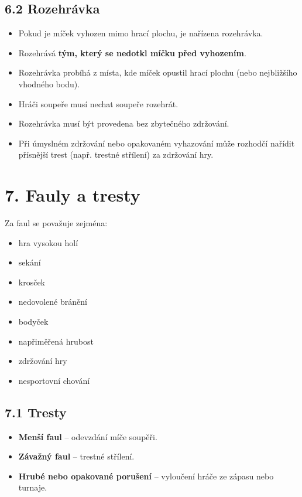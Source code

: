 \documentclass[a4paper,12pt]{article}
\begin{document}
\subsection*{6.2 Rozehrávka}
\begin{itemize}
    \item Pokud je míček vyhozen mimo hrací plochu, je nařízena rozehrávka.
    \item Rozehrává \textbf{tým, který se \textbf{ne}dotkl míčku před vyhozením}.
    \item Rozehrávka probíhá z místa, kde míček opustil hrací plochu (nebo nejbližšího vhodného bodu).
    \item Hráči soupeře musí nechat soupeře rozehrát.
    \item Rozehrávka musí být provedena bez zbytečného zdržování.
    \item Při úmyslném zdržování nebo opakovaném vyhazování může rozhodčí nařídit přísnější trest (např. trestné střílení) za zdržování hry.
\end{itemize}

\section*{7. Fauly a tresty}
Za faul se považuje zejména:
\begin{itemize}
    \item hra vysokou holí
    \item sekání
    \item krosček
    \item nedovolené bránění
    \item bodyček
    \item napřiměřená hrubost
    \item zdržování hry
    \item nesportovní chování
\end{itemize}

\subsection*{7.1 Tresty}
\begin{itemize}
    \item \textbf{Menší faul} – odevzdání míče soupěři.
    \item \textbf{Závažný faul} – trestné střílení.
    \item \textbf{Hrubé nebo opakované porušení} – vyloučení hráče ze zápasu nebo turnaje.
\end{itemize}
\end{document}
